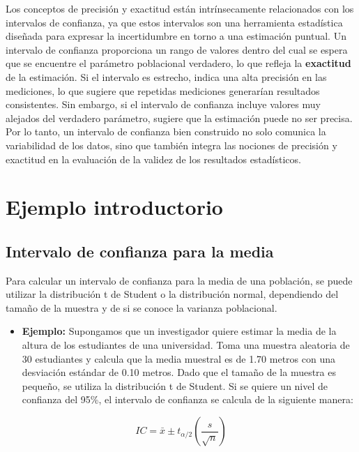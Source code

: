\documentclass[
  letterpaper,
  DIV=11,
  numbers=noendperiod]{scrreprt}
\providecommand{\tightlist}{%
  \setlength{\itemsep}{0pt}\setlength{\parskip}{0pt}}\usepackage{longtable,booktabs,array}
\begin{document}
Los conceptos de precisión y exactitud están intrínsecamente
relacionados con los intervalos de confianza, ya que estos intervalos
son una herramienta estadística diseñada para expresar la incertidumbre
en torno a una estimación puntual. Un intervalo de confianza proporciona
un rango de valores dentro del cual se espera que se encuentre el
parámetro poblacional verdadero, lo que refleja la \textbf{exactitud} de
la estimación. Si el intervalo es estrecho, indica una alta precisión en
las mediciones, lo que sugiere que repetidas mediciones generarían
resultados consistentes. Sin embargo, si el intervalo de confianza
incluye valores muy alejados del verdadero parámetro, sugiere que la
estimación puede no ser precisa. Por lo tanto, un intervalo de confianza
bien construido no solo comunica la variabilidad de los datos, sino que
también integra las nociones de precisión y exactitud en la evaluación
de la validez de los resultados estadísticos.

\section{Ejemplo introductorio}\label{ejemplo-introductorio}

\subsection{Intervalo de confianza para la
media}\label{intervalo-de-confianza-para-la-media}

Para calcular un intervalo de confianza para la media de una población,
se puede utilizar la distribución t de Student o la distribución normal,
dependiendo del tamaño de la muestra y de si se conoce la varianza
poblacional.

\begin{itemize}
\tightlist
\item
  \textbf{Ejemplo:} Supongamos que un investigador quiere estimar la
  media de la altura de los estudiantes de una universidad. Toma una
  muestra aleatoria de 30 estudiantes y calcula que la media muestral es
  de 1.70 metros con una desviación estándar de 0.10 metros. Dado que el
  tamaño de la muestra es pequeño, se utiliza la distribución t de
  Student. Si se quiere un nivel de confianza del 95\%, el intervalo de
  confianza se calcula de la siguiente manera:
\end{itemize}

\[IC = \bar{x} \pm t_{\alpha/2} \left(\frac{s}{\sqrt{n}}\right)\]
\end{document}
